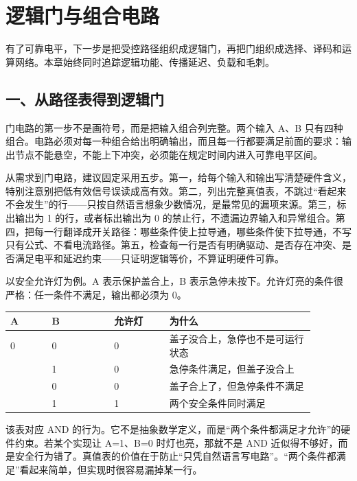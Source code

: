 \chapter{逻辑门与组合电路}

\begin{keyidea}
有了可靠电平，下一步是把受控路径组织成逻辑门，再把门组织成选择、译码和运算网络。本章始终同时追踪逻辑功能、传播延迟、负载和毛刺。
\end{keyidea}

\section{一、从路径表得到逻辑门}

门电路的第一步不是画符号，而是把输入组合列完整。两个输入 A、B 只有四种组合。电路必须对每一种组合给出明确输出，而且每一行都要满足前面的要求：输出节点不能悬空，不能上下冲突，必须能在规定时间内进入可靠电平区间。

从需求到门电路，建议固定采用五步。第一，给每个输入和输出写清楚硬件含义，特别注意别把低有效信号误读成高有效。第二，列出完整真值表，不跳过“看起来不会发生”的行——只按自然语言想象少数情况，是最常见的漏项来源。第三，标出输出为 1 的行，或者标出输出为 0 的禁止行，不遗漏边界输入和异常组合。第四，把每一行翻译成开关路径：哪些条件使上拉导通，哪些条件使下拉导通，不写只有公式、不看电流路径。第五，检查每一行是否有明确驱动、是否存在冲突、是否满足电平和延迟约束——只证明逻辑等价，不算证明硬件可靠。

以安全允许灯为例。A 表示保护盖合上，B 表示急停未按下。允许灯亮的条件很严格：任一条件不满足，输出都必须为 0。

\begin{longtable}{L{0.12\linewidth}L{0.18\linewidth}L{0.16\linewidth}L{0.42\linewidth}}
\toprule
A & B & 允许灯 & 为什么 \\
 & 0 & 0 & 盖子没合上，急停也不是可运行状态 \\ & 1 & 0 & 急停条件满足，但盖子没合上 \\ & 0 & 0 & 盖子合上了，但急停条件不满足 \\ & 1 & 1 & 两个安全条件同时满足 \\
\bottomrule
\end{longtable}

该表对应 AND 的行为。它不是抽象数学定义，而是“两个条件都满足才允许”的硬件约束。若某个实现让 A=1、B=0 时灯也亮，那就不是 AND 近似得不够好，而是安全行为错了。真值表的价值在于防止“只凭自然语言写电路”。“两个条件都满足”看起来简单，但实现时很容易漏掉某一行。

